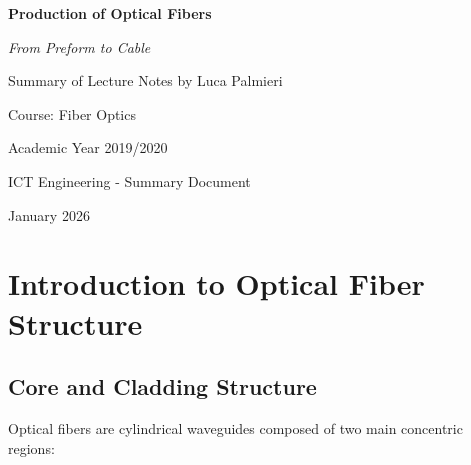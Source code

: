 \documentclass[a4paper, 11pt]{article}
\begin{document}
\begin{titlepage}
    \centering
    \vspace*{2cm}
    
    {\Huge\bfseries Production of Optical Fibers\par}
    \vspace{0.5cm}
    {\Large\textit{From Preform to Cable}\par}
    
    \vspace{2cm}
    
    {\large Summary of Lecture Notes by Luca Palmieri\par}
    {\large Course: Fiber Optics\par}
    {\large Academic Year 2019/2020\par}
    
    \vspace{3cm}
    
    \begin{abstract}
    This document provides a comprehensive technical summary of the optical fiber production process, covering the fundamental structure of optical fibers (core/cladding), propagation principles, and the three main production phases: preform manufacturing, fiber drawing, and cabling. Special emphasis is placed on Chemical Vapor Deposition (CVD) techniques including MCVD, PCVD, OVD, and VAD, with detailed analysis of their chemical reactions, advantages, and disadvantages.
    \end{abstract}
    
    \vfill
    
    {\large ICT Engineering - Summary Document\par}
    {\large January 2026\par}
\end{titlepage}

\tableofcontents
\newpage

\section{Introduction to Optical Fiber Structure}

\subsection{Core and Cladding Structure}

Optical fibers are cylindrical waveguides composed of two main concentric regions:
\end{document}
